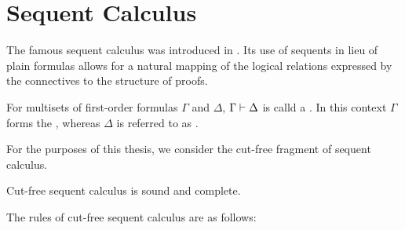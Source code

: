 \section{Sequent Calculus}

The famous sequent calculus was introduced in \cite{Gentzen}.
Its use of sequents in lieu of plain formulas allows for a natural mapping of the logical relations expressed by the connectives to the structure of proofs.

\begin{defi} 
	For multisets of first-order formulas $\Gamma$ and $\Delta$,  $\Gamma \vdash \Delta$ is calld a . 
	In this context $\Gamma$ forms the , whereas $\Delta$ is referred to as .
\end{defi} 

For the purposes of this thesis, we consider the cut-free fragment of sequent calculus.

\begin{thm}
	Cut-free sequent calculus is sound and complete.
\end{thm}

The rules of cut-free sequent calculus are as follows:

\newcommand{\calculussec}[1]{\subsubsection*{#1}}
\newenvironment{lkdefsec}{
		\begin{adjustwidth}{0.05\textwidth}{0.05\textwidth}
		}{
		\end{adjustwidth}
}



